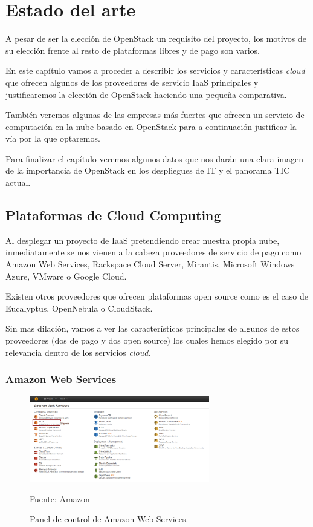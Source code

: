 \chapter{Estado del arte} 
\label{chap:estadodelarte}

A pesar de ser la elección de OpenStack un requisito del proyecto, los motivos de su elección frente al resto de plataformas libres y de pago son varios. 

En este capítulo vamos a proceder a describir los servicios y características \textit{cloud} que ofrecen algunos de los proveedores de servicio IaaS principales y justificaremos la elección de OpenStack haciendo una pequeña comparativa.

También veremos algunas de las empresas más fuertes que ofrecen un servicio de computación en la nube basado en OpenStack para a continuación justificar la vía por la que optaremos.

Para finalizar el capítulo veremos algunos datos que nos darán una clara imagen de la importancia de OpenStack en los despliegues de IT y el panorama TIC actual.

\section{Plataformas de Cloud Computing}
Al desplegar un proyecto de IaaS pretendiendo crear nuestra propia nube, inmediatamente se nos vienen a la cabeza proveedores de servicio de pago como Amazon Web Services, Rackspace Cloud Server, Mirantis, Microsoft Windows Azure, VMware o Google Cloud. 

Existen otros proveedores que ofrecen plataformas open source como es el caso de Eucalyptus, OpenNebula o CloudStack.

Sin mas dilación, vamos a ver las características principales de algunos de estos proveedores (dos de pago y dos open source) los cuales hemos elegido por su relevancia dentro de los servicios \textit{cloud}.

\subsection{Amazon Web Services}

\begin{figure}
    \centering
    \includegraphics[width=0.7\textwidth]{imagenes/capitulo2/amazon.png}
    \caption{Panel de control de Amazon Web Services.}
	\vspace{0.3cm}
    \footnotesize{Fuente: Amazon}
    \label{amazon}
\end{figure}


